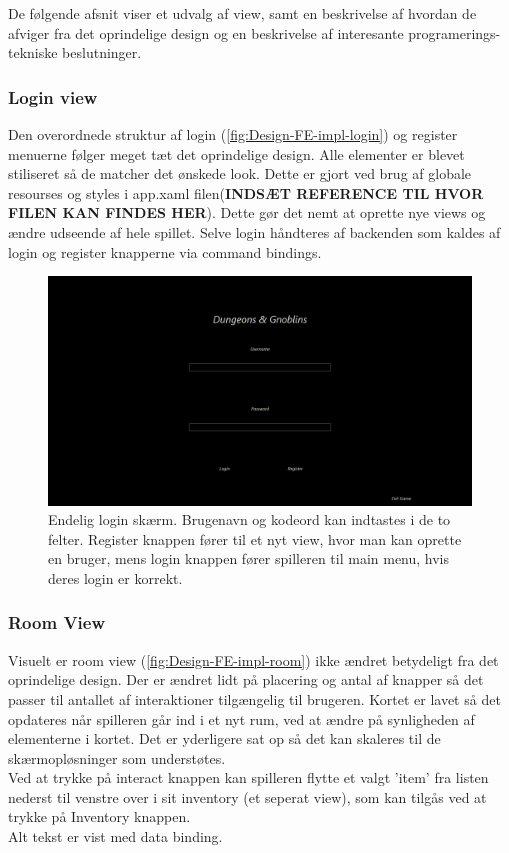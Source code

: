 \noindent De følgende afsnit viser et udvalg af view, samt en beskrivelse af hvordan de afviger fra det oprindelige design og en beskrivelse af interesante programerings-tekniske beslutninger.

\subsubsection{Login view}
Den overordnede struktur af login (\autoref{fig:Design-FE-impl-login}) og register menuerne følger meget tæt det oprindelige design. Alle elementer er blevet stiliseret så de matcher det ønskede look. Dette er gjort ved brug af globale resourses og styles i app.xaml filen(\textbf{INDSÆT REFERENCE TIL HVOR FILEN KAN FINDES HER}). Dette gør det nemt at oprette nye views og ændre udseende af hele spillet. Selve login håndteres af backenden som kaldes af login og register knapperne via command bindings.

\begin{figure}[H]
\centering
\includegraphics[width = \textwidth]{02-Body/Images/login_final.PNG}
\caption{Endelig login skærm. Brugenavn og kodeord kan indtastes i de to felter. Register knappen fører til et nyt view, hvor man kan oprette en bruger, mens login knappen fører spilleren til main menu, hvis deres login er korrekt.}
\label{fig:Design-FE-impl-login}
\end{figure}

\subsubsection{Room View}

Visuelt er room view (\autoref{fig:Design-FE-impl-room}) ikke ændret betydeligt fra det oprindelige design. Der er ændret lidt på placering og antal af knapper så det passer til antallet af interaktioner tilgængelig til brugeren. Kortet er lavet så det  opdateres når spilleren går ind i et nyt rum, ved at ændre på synligheden af elementerne i kortet. Det er yderligere sat op så det kan skaleres til de skærmopløsninger som understøtes.\\
Ved at trykke på interact knappen kan spilleren flytte et valgt 'item' fra listen nederst til venstre over i sit inventory (et seperat view), som kan tilgås ved at trykke på Inventory knappen.\\
Alt tekst er vist med data binding.

